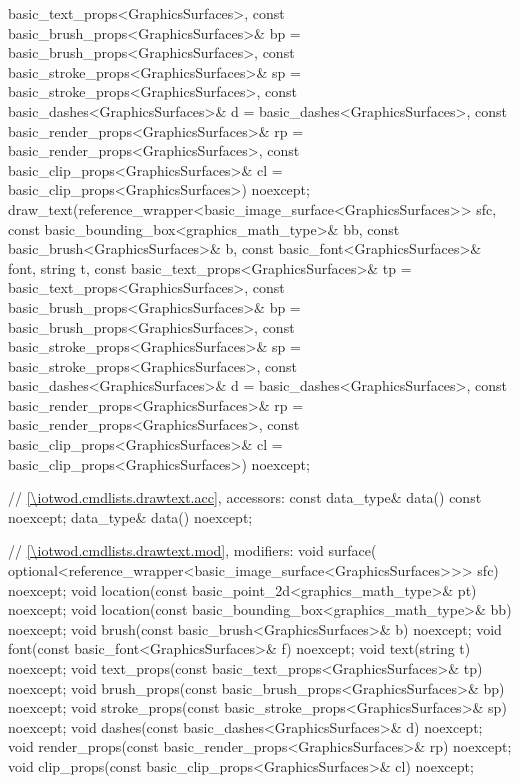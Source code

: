 \begin{codeblock}
{{      basic_text_props<GraphicsSurfaces>{},
      const basic_brush_props<GraphicsSurfaces>& bp = 
      basic_brush_props<GraphicsSurfaces>{},
      const basic_stroke_props<GraphicsSurfaces>& sp = 
      basic_stroke_props<GraphicsSurfaces>{},
      const basic_dashes<GraphicsSurfaces>& d = 
      basic_dashes<GraphicsSurfaces>{},
      const basic_render_props<GraphicsSurfaces>& rp = 
      basic_render_props<GraphicsSurfaces>{},
      const basic_clip_props<GraphicsSurfaces>& cl = 
      basic_clip_props<GraphicsSurfaces>{}) noexcept;
    draw_text(reference_wrapper<basic_image_surface<GraphicsSurfaces>> sfc, 
      const basic_bounding_box<graphics_math_type>& bb,
      const basic_brush<GraphicsSurfaces>& b,
      const basic_font<GraphicsSurfaces>& font, string t,
      const basic_text_props<GraphicsSurfaces>& tp = 
      basic_text_props<GraphicsSurfaces>{},
      const basic_brush_props<GraphicsSurfaces>& bp = 
      basic_brush_props<GraphicsSurfaces>{},
      const basic_stroke_props<GraphicsSurfaces>& sp = 
      basic_stroke_props<GraphicsSurfaces>{},
      const basic_dashes<GraphicsSurfaces>& d = 
      basic_dashes<GraphicsSurfaces>{},
      const basic_render_props<GraphicsSurfaces>& rp = 
      basic_render_props<GraphicsSurfaces>{},
      const basic_clip_props<GraphicsSurfaces>& cl = 
      basic_clip_props<GraphicsSurfaces>{}) noexcept;
    
    // \ref{\iotwod.cmdlists.drawtext.acc}, accessors:
    const data_type& data() const noexcept;
    data_type& data() noexcept;

    // \ref{\iotwod.cmdlists.drawtext.mod}, modifiers:
    void surface(
      optional<reference_wrapper<basic_image_surface<GraphicsSurfaces>>> sfc) 
      noexcept;
    void location(const basic_point_2d<graphics_math_type>& pt) noexcept;
    void location(const basic_bounding_box<graphics_math_type>& bb) noexcept;
    void brush(const basic_brush<GraphicsSurfaces>& b) noexcept;
    void font(const basic_font<GraphicsSurfaces>& f) noexcept;
    void text(string t) noexcept;
    void text_props(const basic_text_props<GraphicsSurfaces>& tp) noexcept;
    void brush_props(const basic_brush_props<GraphicsSurfaces>& bp) noexcept;
    void stroke_props(const basic_stroke_props<GraphicsSurfaces>& sp) noexcept;
    void dashes(const basic_dashes<GraphicsSurfaces>& d) noexcept;
    void render_props(const basic_render_props<GraphicsSurfaces>& rp) noexcept;
    void clip_props(const basic_clip_props<GraphicsSurfaces>& cl) noexcept;

}}
\end{codeblock}
